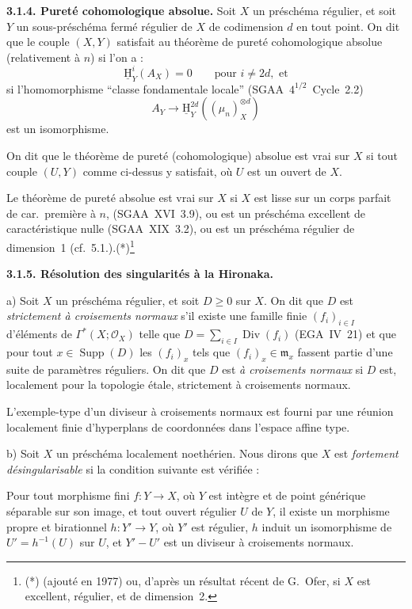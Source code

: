 \documentclass[11pt]{article}
\DeclareMathOperator{\Supp}{Supp}
\DeclareMathOperator{\Div}{Div}
\providecommand{\cO}{\mathcal{O}}
\providecommand{\fm}{\mathfrak{m}}
\renewcommand{\H}{\mathrm{H}}
\providecommand{\Supp}{\operatorname{Supp}}
\begin{document}
\textbf{3.1.4. Pureté cohomologique absolue.} Soit $X$ un préschéma régulier, et soit $Y$ un sous-préschéma fermé régulier de $X$ de codimension $d$ en tout point. On dit que le couple $(X,Y)$ satisfait au théorème de pureté cohomologique absolue (relativement à $n$) si l'on a :
\[
\underline{\H}^i_Y(A_X) = 0 \qquad \text{pour } i \neq 2d, \text{ et}
\]
si l'homomorphisme ``classe fondamentale locale'' (SGAA~$4^{1/2}$~Cycle~2.2)
\[
A_Y \longrightarrow \underline{\H}^{2d}_Y((\mu_n)^{\otimes d}_X)
\]
est un isomorphisme.

On dit que le théorème de pureté (cohomologique) absolue est vrai sur $X$ si tout couple $(U,Y)$ comme ci-dessus y satisfait, où $U$ est un ouvert de $X$.

Le théorème de pureté absolue est vrai sur $X$ si $X$ est lisse sur un corps parfait de car.~première à $n$, (SGAA~XVI~3.9), ou est un préschéma excellent de caractéristique nulle (SGAA~XIX~3.2), ou est un préschéma régulier de dimension~1 (cf.~5.1.).(*)\footnote{(*) (ajouté en 1977) ou, d'après un résultat récent de G.~Ofer, si $X$ est excellent, régulier, et de dimension~2.}

\textbf{3.1.5. Résolution des singularités à la Hironaka.}

a) Soit $X$ un préschéma régulier, et soit $D \geqslant 0$ sur $X$. On dit que $D$ est \emph{strictement à croisements normaux} s'il existe une famille finie $(f_i)_{i \in I}$ d'éléments de $\Gamma^{*}(X; \cO_X)$ telle que $D = \sum_{i \in I} \Div(f_i)$ (EGA~IV~21) et que pour tout $x \in \Supp(D)$ les $(f_i)_x$ tels que $(f_i)_x \in \fm_x$ fassent partie d'une suite de paramètres réguliers. On dit que $D$ est \emph{à croisements normaux} si $D$ est, localement pour la topologie étale, strictement à croisements normaux.

L'exemple-type d'un diviseur à croisements normaux est fourni par une réunion localement finie d'hyperplans de coordonnées dans l'espace affine type.

b) Soit $X$ un préschéma localement noethérien. Nous dirons que $X$ est \emph{fortement désingularisable} si la condition suivante est vérifiée :

Pour tout morphisme fini $f : Y \to X$, où $Y$ est intègre et de point générique séparable sur son image, et tout ouvert régulier $U$ de $Y$, il existe un morphisme propre et birationnel $h : Y' \to Y$, où $Y'$ est régulier, $h$ induit un isomorphisme de $U' = h^{-1}(U)$ sur $U$, et $Y' - U'$ est un diviseur à croisements normaux.
\end{document}
